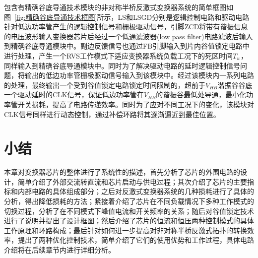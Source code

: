 包含有精确谷底导通技术模块的非对称半桥反激式变换器系统的简单框图如图~\ref{fig:精确谷底导通技术框图}所示，LS和LSGD分别是逻辑控制电路和驱动电路针对低边功率管产生的逻辑控制信号和栅极驱动信号，引脚ZCD将带有谐振信息的电压波形输入变换器芯片后经过一个低通滤波器(low pass filter)电路滤波后输入到精确谷底导通模块中。副边反馈信号也通过FB引脚输入到片内谷值锁定电路中进行处理，产生一个RVS工作模式下适应变换器系统负载工况下的死区时间$T_w$，同样输入到精确谷底导通模块中。同时为了解决驱动电路的延时逻辑控制信号问题，将输出的低边功率管栅极驱动信号输入到该模块中。经过该模块内一系列电路的处理，最终输出一个受到谷值锁定电路锁定时间限制的，超前于$V_{HB}$谐振谷谷底一个驱动延时的CLK信号，保证低边功率管在$V_{HB}$的谐振谷最低处导通，最小化功率管开关损耗，提高了电路传递效率。同时为了应对不同工况下的变化，该模块对CLK信号同样进行动态控制，通过补偿环路将其逐渐逼近到最佳位置。






\section{小结}

本章对变换器芯片的整体进行了系统性的描述，首先分析了芯片的外围电路的设计，简单介绍了外部交流转直流和芯片启动与供电过程；其次介绍了芯片的主要指标和内部电路的具体组成部分；之后对反激式变换器系统的几种损耗进行了具体的分析，得出降低损耗的方法；紧接着介绍了芯片在不同负载情况下多种工作模式的切换过程，分析了在不同模式下峰值电流和开关频率的关系；随后对谷值锁定技术进行了说明并提出了设计框图；然后介绍了芯片的恒流和恒压两种控制模式的具体工作原理和环路构成；最后针对如何进一步提高对非对称半桥反激式拓扑的转换效率，提出了两种优化控制技术，简单介绍了它们的使用优势和工作过程，具体电路介绍将在后续章节内进行详细分析。



